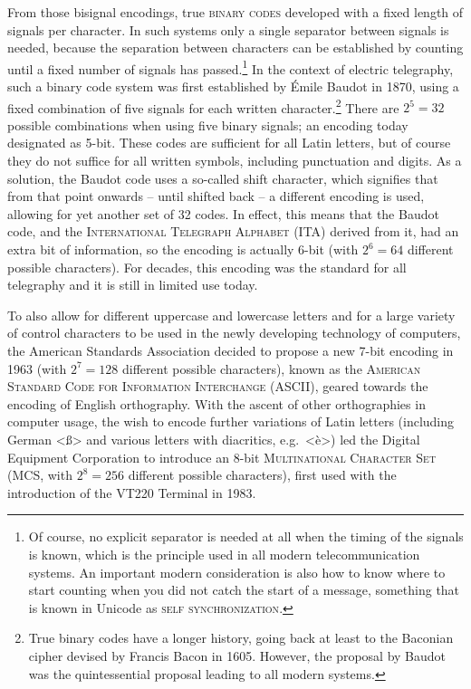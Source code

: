 From those bisignal encodings, true \textsc{binary codes} developed with a fixed
length of signals per character. In such systems only a single separator between
signals is needed, because the separation between characters can be established
by counting until a fixed number of signals has passed.\footnote{Of course, no
explicit separator is needed at all when the timing of the signals is known, which is
the principle used in all modern telecommunication systems. An important modern
consideration is also how to know where to start counting when you did not catch
the start of a message, something that is known in Unicode as \textsc{self
synchronization}.} In the context of electric telegraphy, such a binary code
system was first established by Émile Baudot in 1870, using a fixed combination
of five signals for each written character.\footnote{True binary codes have a
longer history, going back at least to the Baconian cipher devised by Francis
Bacon in 1605. However, the proposal by Baudot was the quintessential proposal
leading to all modern systems.} There are $2^5 = 32$ possible combinations when
using five binary signals; an encoding today designated as 5-bit. These
codes are sufficient for all Latin letters, but of course they do not suffice
for all written symbols, including punctuation and digits. As a solution, the
Baudot code uses a so-called shift character, which signifies that from
that point onwards -- until shifted back -- a different encoding is used, allowing
for yet another set of 32 codes. In effect, this means that the Baudot code, and
the \textsc{International Telegraph Alphabet} (ITA) derived from it, had an
extra bit of information, so the encoding is actually 6-bit (with $2^6
= 64$ different possible characters). For decades, this encoding was the
standard for all telegraphy and it is still in limited use today.

To also allow for different uppercase and lowercase letters and for a large
variety of control characters to be used in the newly developing technology of
computers, the American Standards Association decided to propose a new 7-bit
encoding in 1963 (with $2^7 = 128$ different possible characters), known as the
\textsc{American Standard Code for Information Interchange} (ASCII), geared
towards the encoding of English orthography. With the ascent of other
orthographies in computer usage, the wish to encode further variations of Latin
letters (including German <ß> and various letters with diacritics, e.g.\ <è>) led the
Digital Equipment Corporation to introduce an 8-bit \textsc{Multinational
Character Set} (MCS, with $2^8 = 256$ different possible characters), first used
with the introduction of the VT{\large 220} Terminal in 1983. 

